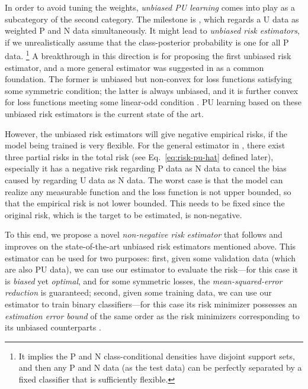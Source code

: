 \documentclass{article}
\begin{document}
In order to avoid tuning the weights, \emph{unbiased PU learning} comes into play as a subcategory of the second category. The milestone is \cite{elkan08kdd}, which regards a U data as weighted P and N data simultaneously. It might lead to \emph{unbiased risk estimators}, if we unrealistically assume that the class-posterior probability is one for all P data.%
\footnote{It implies the P and N class-conditional densities have disjoint support sets, and then any P and N data (as the test data) can be perfectly separated by a fixed classifier that is sufficiently flexible.}
A breakthrough in this direction is \cite{christo14nips} for proposing the first unbiased risk estimator, and a more general estimator was suggested in \cite{christo15icml} as a common foundation. The former is unbiased but non-convex for loss functions satisfying some symmetric condition; the latter is always unbiased, and it is further convex for loss functions meeting some linear-odd condition \citep{natarajan13nips,patrini16icml}. PU learning based on these unbiased risk estimators is the current state of the art.

However, the unbiased risk estimators will give negative empirical risks, if the model being trained is very flexible. For the general estimator in \cite{christo15icml}, there exist three partial risks in the total risk (see Eq.~\eqref{eq:risk-pu-hat} defined later), especially it has a negative risk regarding P data as N data to cancel the bias caused by regarding U data as N data. The worst case is that the model can realize any measurable function and the loss function is not upper bounded, so that the empirical risk is not lower bounded. This needs to be fixed since the original risk, which is the target to be estimated, is non-negative.

To this end, we propose a novel \emph{non-negative risk estimator} that follows and improves on the state-of-the-art unbiased risk estimators mentioned above. This estimator can be used for two purposes: first, given some validation data (which are also PU data), we can use our estimator to evaluate the risk---for this case it is \emph{biased} yet \emph{optimal}, and for some symmetric losses, the \emph{mean-squared-error reduction} is guaranteed; second, given some training data, we can use our estimator to train binary classifiers---for this case its risk minimizer possesses an \emph{estimation error bound} of the same order as the risk minimizers corresponding to its unbiased counterparts \citep{christo14nips,christo15icml,niu16nips}.
\end{document}
